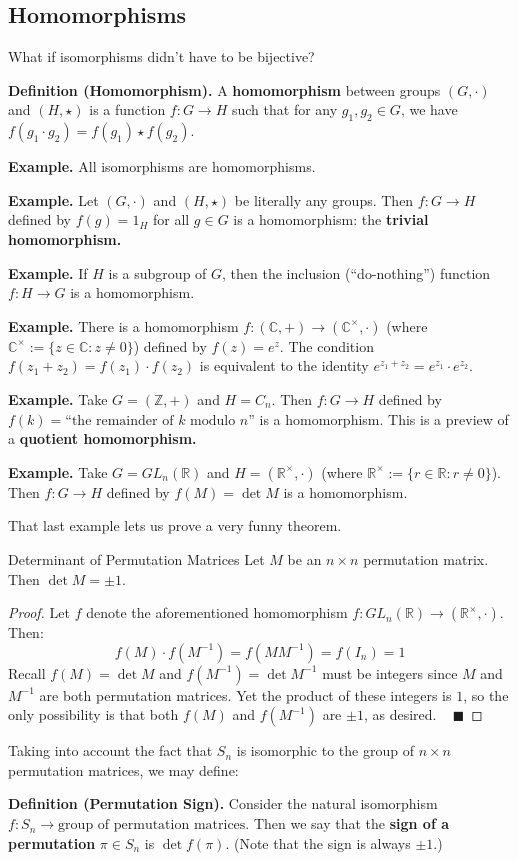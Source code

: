 \subsection{Homomorphisms}

What if isomorphisms didn't have to be bijective?

\textbf{Definition (Homomorphism).} A \textbf{homomorphism} between groups $(G,\cdot)$ and $(H, \star)$ is a function $f: G \to H$ such that for any $g_1, g_2 \in G$, we have $f(g_1 \cdot g_2) = f(g_1) \star f(g_2)$.

\textbf{Example.} All isomorphisms are homomorphisms.

\textbf{Example.} Let $(G, \cdot)$ and $(H, \star)$ be literally any groups.  Then $f: G \to H$ defined by $f(g) = 1_H$ for all $g \in G$ is a homomorphism: the \textbf{trivial homomorphism.}

\textbf{Example.} If $H$ is a subgroup of $G$, then the inclusion (``do-nothing'') function $f: H \to G$ is a homomorphism.

\textbf{Example.} There is a homomorphism $f: (\mathbb{C}, +) \to (\mathbb{C}^{\times}, \cdot)$ (where $\mathbb{C}^{\times} := \{z \in \mathbb{C}: z \neq 0 \}$) defined by $f(z) = e^z$.  The condition $f(z_1 + z_2) = f(z_1) \cdot f(z_2)$ is equivalent to the identity $e^{z_1 + z_2} = e^{z_1} \cdot e^{z_2}$.

\textbf{Example.} Take $G = (\mathbb{Z}, +)$ and $H = C_n$.  Then $f: G \to H$ defined by $f(k) = \text{``the remainder of } k \text{ modulo } n\text{''}$ is a homomorphism.  This is a preview of a \textbf{quotient homomorphism.}

\textbf{Example.} Take $G = GL_n(\mathbb{R})$ and $H = (\mathbb{R}^{\times}, \cdot)$ (where $\mathbb{R}^{\times} := \{r \in \mathbb{R}: r \neq 0 \}$).  Then $f: G \to H$ defined by $f(M) = \det M$ is a homomorphism.

That last example lets us prove a very funny theorem.

\begin{theorem}{Determinant of Permutation Matrices}
    Let $M$ be an $n \times n$ permutation matrix.  Then $\det M = \pm 1$.
\end{theorem}

\begin{proof}
    Let $f$ denote the aforementioned homomorphism $f: GL_n(\mathbb{R}) \to (\mathbb{R}^{\times}, \cdot)$.  Then:
    \[ f(M) \cdot f(M^{-1}) = f(MM^{-1}) = f(I_n) = 1 \]
    Recall $f(M) = \det M$ and $f(M^{-1}) = \det M^{-1}$ must be integers since $M$ and $M^{-1}$ are both permutation matrices.  Yet the product of these integers is $1$, so the only possibility is that both $f(M)$ and $f(M^{-1})$ are $\pm 1$, as desired. ~ $\blacksquare$
\end{proof}

Taking into account the fact that $S_n$ is isomorphic to the group of $n \times n$ permutation matrices, we may define:

\textbf{Definition (Permutation Sign).} Consider the natural isomorphism $f: S_n \to \text{group of permutation matrices}$.  Then we say that the \textbf{sign of a permutation} $\pi \in S_n$ is $\det f(\pi)$.  (Note that the sign is always $\pm 1$.)

